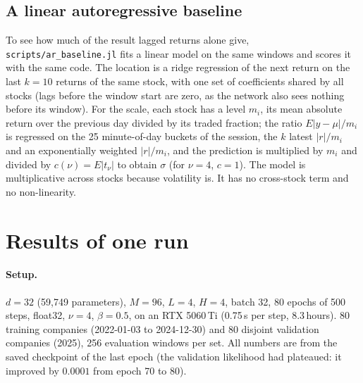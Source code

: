 \documentclass[11pt]{article}
\newcommand{\code}[1]{\texttt{#1}}
\begin{document}
\subsection{A linear autoregressive baseline}

To see how much of the result lagged returns alone give, \code{scripts/ar\_baseline.jl} fits a linear model on the same windows and scores it with the same code.
The location is a ridge regression of the next return on the last $k{=}10$ returns of the same stock, with one set of coefficients shared by all stocks (lags before the window start are zero, as the network also sees nothing before its window).
For the scale, each stock has a level $m_i$, its mean absolute return over the previous day divided by its traded fraction; the ratio $E|y-\mu|/m_i$ is regressed on the 25 minute-of-day buckets of the session, the $k$ latest $|r|/m_i$ and an exponentially weighted $|r|/m_i$, and the prediction is multiplied by $m_i$ and divided by
$c(\nu)=E|t_\nu|$ to obtain $\sigma$ (for $\nu=4$, $c=1$). The model is multiplicative across stocks because volatility is. It has no cross-stock term and no non-linearity.

\section{Results of one run}\label{sec:results}

\paragraph{Setup.} $d=32$ (59{,}749 parameters), $M=96$, $L=4$, $H=4$, batch 32, 80 epochs of 500 steps, float32, $\nu=4$, $\beta=0.5$, on an RTX 5060\,Ti (0.75\,s per step, 8.3\,hours). 80 training companies (2022-01-03 to 2024-12-30) and 80 disjoint validation companies (2025), 256 evaluation windows per set.
All numbers are from the saved checkpoint of the last epoch (the validation likelihood had plateaued: it improved by $0.0001$ from epoch 70 to 80).
\end{document}
